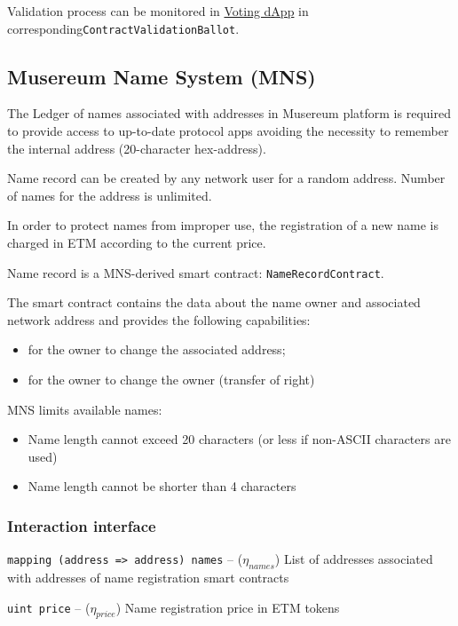 \documentclass[12pt]{report}
\def\code#1{\colorbox{light-gray}{\texttt{#1}}}
\begin{document}
Validation process can be monitored in \hyperref[tech-apps-voting]{Voting dApp} in corresponding\code{ContractValidationBallot}.
\subsection{Musereum Name System (MNS)}
\label{tech-apps-mns}
The Ledger of names associated with addresses in Musereum platform is required to provide access to up-to-date protocol apps avoiding the necessity to remember the internal address (20-character hex-address).

Name record can be created by any network user for a random address. Number of names for the address is unlimited.

In order to protect names from improper use, the registration of a new name is charged in ETM according to the current price.

Name record is a MNS-derived smart contract: \code{NameRecordContract}.

The smart contract contains the data about the name owner and associated network address and provides the following capabilities:
\begin{itemize}
	\item for the owner to change the associated address;
	\item for the owner to change the owner (transfer of right)
\end{itemize} 

MNS limits available names: 
\begin{itemize}
	\item Name length cannot exceed 20 characters (or less if non-ASCII characters are used) 
	\item Name length cannot be shorter than 4 characters
\end{itemize}
\subsubsection{Interaction interface}
\label{tech-apps-mns-api}
\code{mapping (address => address) names} – ($\eta_{names}$)\hfill\null\linebreak
List of addresses associated with addresses of name registration smart contracts

\code{uint price} – ($\eta_{price}$)\hfill\null\linebreak
Name registration price in ETM tokens
\end{document}
